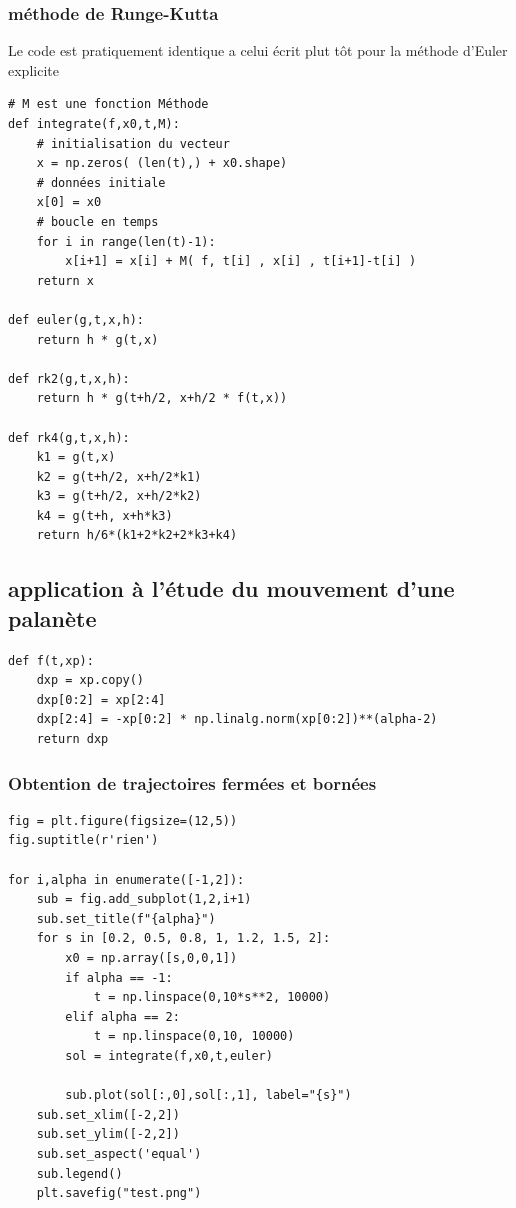 \documentclass[11pt]{article}
\begin{document}
\subsubsection{méthode de Runge-Kutta}
\label{sec:orgb564734}

Le code est pratiquement identique a celui écrit plut tôt pour la méthode d'Euler explicite 

\begin{verbatim}
# M est une fonction Méthode 
def integrate(f,x0,t,M):
    # initialisation du vecteur
    x = np.zeros( (len(t),) + x0.shape)
    # données initiale
    x[0] = x0
    # boucle en temps
    for i in range(len(t)-1):
        x[i+1] = x[i] + M( f, t[i] , x[i] , t[i+1]-t[i] )
    return x

def euler(g,t,x,h):
    return h * g(t,x)

def rk2(g,t,x,h):
    return h * g(t+h/2, x+h/2 * f(t,x))

def rk4(g,t,x,h):
    k1 = g(t,x)
    k2 = g(t+h/2, x+h/2*k1)
    k3 = g(t+h/2, x+h/2*k2)
    k4 = g(t+h, x+h*k3)
    return h/6*(k1+2*k2+2*k3+k4)

\end{verbatim}

\subsection{application à l'étude du mouvement d'une palanète}
\label{sec:org8e8cb74}

\begin{verbatim}
def f(t,xp):
    dxp = xp.copy()
    dxp[0:2] = xp[2:4]
    dxp[2:4] = -xp[0:2] * np.linalg.norm(xp[0:2])**(alpha-2)
    return dxp
\end{verbatim}


\subsubsection{Obtention de trajectoires fermées et bornées}
\label{sec:org5ad4861}


\begin{verbatim}
fig = plt.figure(figsize=(12,5))
fig.suptitle(r'rien')

for i,alpha in enumerate([-1,2]):
    sub = fig.add_subplot(1,2,i+1)
    sub.set_title(f"{alpha}")
    for s in [0.2, 0.5, 0.8, 1, 1.2, 1.5, 2]:
        x0 = np.array([s,0,0,1])
        if alpha == -1:
            t = np.linspace(0,10*s**2, 10000)
        elif alpha == 2:
            t = np.linspace(0,10, 10000)
        sol = integrate(f,x0,t,euler)
        
        sub.plot(sol[:,0],sol[:,1], label="{s}")
    sub.set_xlim([-2,2])
    sub.set_ylim([-2,2])
    sub.set_aspect('equal')
    sub.legend()
    plt.savefig("test.png")
\end{verbatim}
\end{document}
